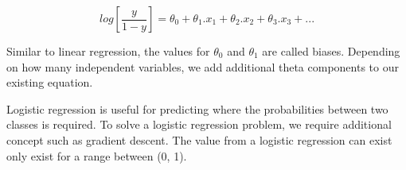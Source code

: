 \documentclass{article}
\begin{document}
\[ log \left[ \dfrac{y}{1 - y} \right]  = \theta_0 + \theta_1.x_1 + \theta_2.x_2 + \theta_3.x_3 + ... \]

Similar to linear regression, the values for $\theta_0$ and $\theta_1$ are called biases. Depending on how many independent variables, we add additional theta components to our existing equation.

Logistic regression is useful for predicting where the probabilities between two classes is required. To solve a logistic regression problem, we require additional concept such as gradient descent. The value from a logistic regression can exist only exist for a range between (0, 1).
\end{document}
